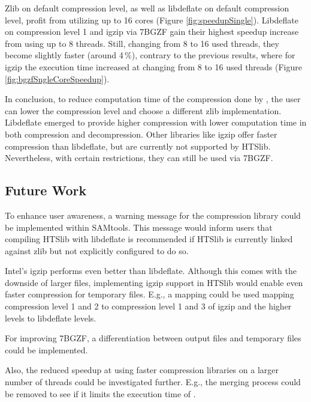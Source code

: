 Zlib on default compression level, as well as libdeflate on default compression level, profit from utilizing up to 16 cores (Figure \ref{fig:speedupSingle}). Libdeflate on compression level 1 and igzip via 7BGZF gain their highest speedup increase from using up to 8 threads. Still, changing from 8 to 16 used threads, they become slightly faster (around 4\,\%), contrary to the previous results, where for igzip the execution time increased at changing from 8 to 16 used threads (Figure \ref{fig:bgzfSngleCoreSpeedup}). 

In conclusion, to reduce computation time of the compression done by \sort, the user can lower the compression level and choose a different zlib implementation. Libdeflate emerged to provide higher compression with lower computation time in both compression and decompression. Other libraries like igzip offer faster compression than libdeflate, but are currently not supported by HTSlib. Nevertheless, with certain restrictions, they can still be used via 7BGZF.


\subsection{Future Work}
To enhance user awareness, a warning message for the compression library could be implemented within SAMtools. This message would inform users that compiling HTSlib with libdeflate is recommended if HTSlib is currently linked against zlib but not explicitly configured to do so.

Intel's igzip performs even better than libdeflate. Although this comes with the downside of larger files, implementing igzip support in HTSlib would enable even faster compression for temporary files. E.g., a mapping could be used mapping compression level 1 and 2 to compression level 1 and 3 of igzip and the higher levels to libdeflate levels.

For improving 7BGZF, a differentiation between output files and temporary files could be implemented.

Also, the reduced speedup at using faster compression libraries on a larger number of threads could be investigated further. E.g., the merging process could be removed to see if it limits the execution time of \sort.